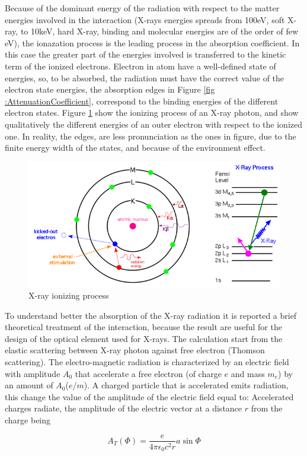 Because of the dominant energy of the radiation with respect to the matter energies involved in the interaction (X-rays energies spreads from 100eV, soft X-ray, to 10keV, hard X-ray, binding and molecular energies are of the order of few eV), the ionazation process is the leading process in the absorption coefficient. In this case the greater part of the energies involved is transferred to the kinetic term of the ionized electrons. Electron in atom have a well-defined state of energies, so, to be absorbed, the radiation must have the correct value of the electron state energies, the absorption edges in Figure \ref{fig :AttenuationCoefficient}, correspond to the binding energies of the different electron states. Figure \ref{fig: KLM} show the ionizing process of an X-ray photon, and show qualitatively the different energies of an outer electron with respect to the ionized one. In reality, the edges, are less pronunciation as the ones in figure, due to the finite energy width of the states, and because of the environment effect.
\begin{figure}[]
%
\centering
%
\includegraphics[width=.6\textwidth]{Immagini/Chapter1/KLM}
%
\caption{X-ray ionizing process}
%
\label{fig: KLM}
%
\end{figure}
To understand better the absorption of the X-ray radiation it is reported a brief theoretical treatment of the interaction, because the result are useful for the design of the optical element used for X-rays. The calculation start from the elastic scattering between  X-ray photon against free electron (Thomson scattering). The electro-magnetic radiation is characterized by an electric field with amplitude $A_0$ that accelerate a free electron (of charge $e $ and mass $m_e $) by an amount of $A_0 $($e / m $). A charged particle that is accelerated emits radiation, this change the value of the amplitude of the electric field equal to:   Accelerated charges radiate, the amplitude of the electric vector at a distance $r $ from the charge being

\begin{equation}
A_T(\Phi) = \frac{e}{4 \pi \epsilon_0 c^2 r} a \sin \Phi
\label{eq: At1}
\end{equation}

